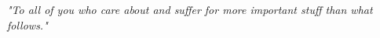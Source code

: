 
\chead[\fancyplain{}{}]
      {\fancyplain{}{}}
\lfoot[\fancyplain{}{}]
      {\fancyplain{}{}}
\cfoot[\fancyplain{}{\thepage}]
      {\fancyplain{}{\thepage}}
\rfoot[\fancyplain{}{}]%
     {\fancyplain{}{\scriptsize}}

\vspace*{20cm}

\begin{flushright}
\emph{"To all of you who care about and suffer for more important stuff than what follows."} \\
\end{flushright}


